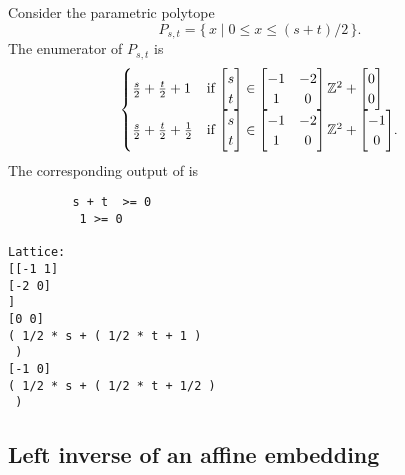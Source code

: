 \begin{example}
Consider the parametric polytope
$$
P_{s,t}=\{\, x \mid 0 \le x \le (s+t)/2 \,\}
.
$$
The enumerator of $P_{s,t}$ is
$$
\begin{cases}
\frac s 2 + \frac t 2 + 1 &
\text{if $\begin{bmatrix}s \\ t \end{bmatrix} \in
\begin{bmatrix}
-1 & -2 \\ 1 & 0
\end{bmatrix}
\mathbb{Z}^2 +
\begin{bmatrix}
0 \\ 0
\end{bmatrix}
$}
\\
\frac s 2 + \frac t 2 + \frac 1 2 &
\text{if $\begin{bmatrix}s \\ t \end{bmatrix} \in
\begin{bmatrix}
-1 & -2 \\ 1 & 0
\end{bmatrix}
\mathbb{Z}^2 +
\begin{bmatrix}
-1 \\ 0
\end{bmatrix}
$}
.
\end{cases}
$$
The corresponding output of  is
\begin{verbatim}
         s + t  >= 0
          1 >= 0

Lattice:
[[-1 1]
[-2 0]
]
[0 0]
( 1/2 * s + ( 1/2 * t + 1 )
 )
[-1 0]
( 1/2 * s + ( 1/2 * t + 1/2 )
 )
\end{verbatim}
\end{example}

\subsection{Left inverse of an affine embedding}

